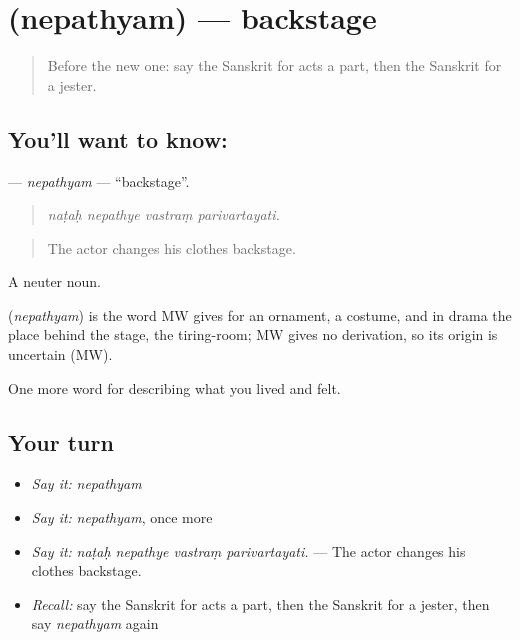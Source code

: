 \section[\texorpdfstring{\sk{नेपथ्यम्} (nepathyam)}{नेपथ्यम् (nepathyam)}]{ (nepathyam) — backstage}

\label{lesson:SA-C523-nepathyam}



\begin{quote}
Before the new one: say the Sanskrit for acts a part, then the Sanskrit for a jester.
\end{quote}

\subsection*{You'll want to know: }
\textbf{} — \emph{nepathyam} — \textquotedblleft{}backstage\textquotedblright{}.

\begin{quote}
   
\end{quote}

\begin{quote}
\emph{naṭaḥ nepathye vastraṃ parivartayati.}
\end{quote}

\begin{quote}
The actor changes his clothes backstage.
\end{quote}

A neuter noun.

\begin{cousinweb}
\textbf{} (\emph{nepathyam}) is the word MW gives for an ornament, a costume, and in drama the place behind the stage, the tiring-room; MW gives no derivation, so its origin is uncertain (MW).
\end{cousinweb}

\begin{grammarlens}[title={What you've built}]
One more word for describing what you lived and felt.
\end{grammarlens}

\subsection*{Your turn}
\begin{itemize}
\raggedright
  \item \emph{Say it:} \emph{nepathyam}
  \item \emph{Say it:} \emph{nepathyam}, once more
  \item \emph{Say it:} \emph{naṭaḥ nepathye vastraṃ parivartayati.} — The actor changes his clothes backstage.
  \item \emph{Recall:} say the Sanskrit for acts a part, then the Sanskrit for a jester, then say \emph{nepathyam} again
\end{itemize}

